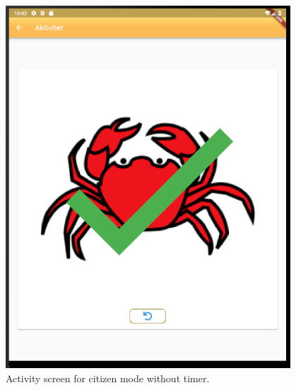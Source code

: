 \begin{figure}[H]
    \begin{center}
        \includegraphics[width=0.95\textwidth]{figures/FinalScreen/showActivityCitizenWithout.png}
    \end{center}
    \caption{Activity screen for citizen mode without timer.}
    \label{fig:finalShowActivityCitizenWithoutTimer}
\end{figure}\begin{figure}[H]
    \begin{center}

\end{center}
\end{figure}
